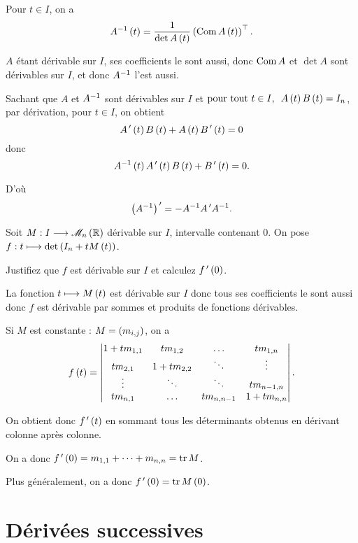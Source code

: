 \begin{corr}
Pour \(t\in I\), on a \[A^{-1}\left(t\right)=\dfrac{1}{\det A\left(t\right)}\left(\operatorname{Com}A\left(t\right)\right)^{\top}.\]

\(A\) étant dérivable sur \(I\), ses coefficients le sont aussi, donc \(\operatorname{Com}A\) et \(\det A\) sont dérivables sur \(I\), et donc \(A^{-1}\) l'est aussi.

Sachant que \(A\) et \(A^{-1}\) sont dérivables sur \(I\) et \(\quantifs{\tpt t\in I}A\paren{t}B\paren{t}=I_n\), par dérivation, pour \(t\in I\), on obtient \[A^{\,\prime}\left(t\right)B\left(t\right)+A\left(t\right)B^{\,\prime}\left(t\right)=0\] donc \[A^{-1}\left(t\right)A^{\,\prime}\left(t\right)B\left(t\right)+B^{\,\prime}\left(t\right)=0.\]

D'où \[\left(A^{-1}\right)^{\,\prime}=-A^{-1} A^{\,\prime} A^{-1}.\]
\end{corr}

\begin{exo}
Soit \(M:I\to\M{n}[\R]\) dérivable sur \(I\), intervalle contenant \(0\). On pose \(f:t\longmapsto\det\left(I_n+tM\left(t\right)\right)\).

Justifiez que \(f\) est dérivable sur \(I\) et calculez \(f^{\,\prime}\left(0\right)\).
\end{exo}

\begin{corr}
La fonction \(t\longmapsto M\left(t\right)\) est dérivable sur \(I\) donc tous ses coefficients le sont aussi donc \(f\) est dérivable par sommes et produits de fonctions dérivables.

Si \(M\) est constante : \(M=\left(m_{i,j}\right)\), on a \[f\left(t\right)=\begin{vmatrix}
1+tm_{1,1} & tm_{1,2} & \dots & tm_{1,n} \\
tm_{2,1} & 1+tm_{2,2} & \ddots & \vdots \\
\vdots & \ddots & \ddots & tm_{n-1,n} \\
tm_{n,1} & \dots & tm_{n,n-1} & 1+tm_{n,n}
\end{vmatrix}.\]

On obtient donc \(f^{\,\prime}\left(t\right)\) en sommant tous les déterminants obtenus en dérivant colonne après colonne.

On a donc \(f^{\,\prime}\left(0\right)=m_{1,1}+\dots+m_{n,n}=\operatorname{tr} M\).

Plus généralement, on a donc \(f^{\,\prime}\left(0\right)=\operatorname{tr} M\left(0\right)\).
\end{corr}

\section{Dérivées successives}

